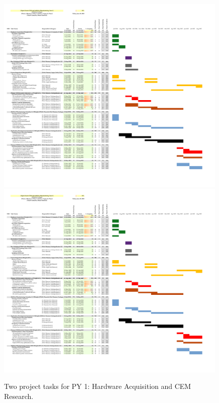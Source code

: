 \documentclass[11pt]{amsart}
\begin{document}
\begin{figure}
\centering
\includegraphics[width=0.99\textwidth,trim=0.6cm 12.2cm 10.05cm 1.35cm,clip=true]{project_planning/cem_project_gantt_yr1.pdf}
\includegraphics[width=0.99\textwidth,trim=0.6cm 7.0cm 10.05cm 7.9cm,clip=true]{project_planning/cem_project_gantt_yr1.pdf}
\caption{\label{fig:gantt_1} Two project tasks for PY 1: Hardware Acquisition and CEM Research.}
\end{figure}
\end{document}
